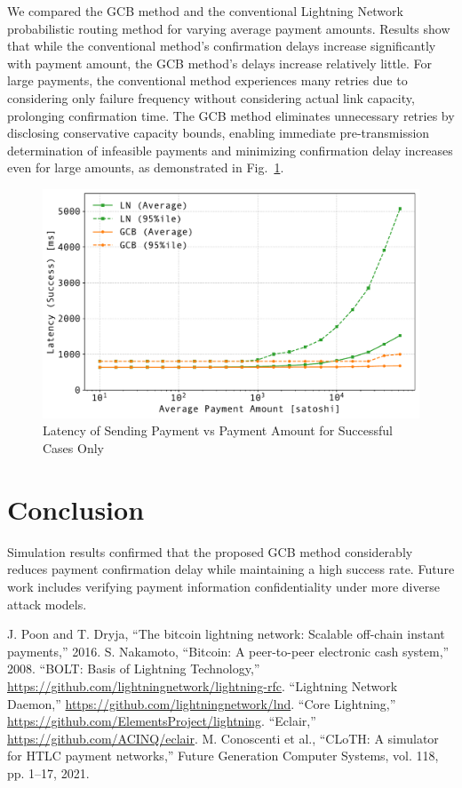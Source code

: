 \documentclass[conference]{IEEEtran}
\begin{document}
We compared the GCB method and the conventional Lightning Network probabilistic routing method for varying average payment amounts.
Results show that while the conventional method's confirmation delays increase significantly with payment amount, the GCB method's delays increase relatively little.
For large payments, the conventional method experiences many retries due to considering only failure frequency without considering actual link capacity, prolonging confirmation time.
The GCB method eliminates unnecessary retries by disclosing conservative capacity bounds, enabling immediate pre-transmission determination of infeasible payments and minimizing confirmation delay increases even for large amounts, as demonstrated in Fig.~\ref{fig:pmt_amt_vs_time}.

\begin{figure}[htbp]
	\centerline{\includegraphics[width=\linewidth]{fig/pmt_amt_vs_time}}
	\caption{Latency of Sending Payment vs Payment Amount for Successful Cases Only}
	\label{fig:pmt_amt_vs_time}
\end{figure}

\section{Conclusion}

Simulation results confirmed that the proposed GCB method considerably reduces payment confirmation delay while maintaining a high success rate.
Future work includes verifying payment information confidentiality under more diverse attack models.

\begin{thebibliography}{00}
	 J. Poon and T. Dryja, ``The bitcoin lightning network: Scalable off-chain instant payments,'' 2016.
	 S. Nakamoto, ``Bitcoin: A peer-to-peer electronic cash system,'' 2008.
	 ``BOLT: Basis of Lightning Technology,'' \url{https://github.com/lightningnetwork/lightning-rfc}.
	 ``Lightning Network Daemon,'' \url{https://github.com/lightningnetwork/lnd}.
	 ``Core Lightning,'' \url{https://github.com/ElementsProject/lightning}.
	 ``Eclair,'' \url{https://github.com/ACINQ/eclair}.
	 M. Conoscenti et al., ``CLoTH: A simulator for HTLC payment networks,'' Future Generation Computer Systems, vol. 118, pp. 1--17, 2021.
\end{thebibliography}
\end{document}
